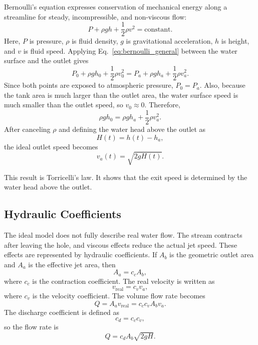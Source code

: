 \documentclass[11pt,letterpaper]{article}
\begin{document}
Bernoulli's equation expresses conservation of mechanical energy along a streamline for steady, incompressible, and non-viscous flow:
\begin{equation}
    P+\rho gh+\frac{1}{2}\rho v^2=\text{constant}.
    \label{eq:bernoulli_general}
\end{equation}
Here, $P$ is pressure, $\rho$ is fluid density, $g$ is gravitational acceleration, $h$ is height, and $v$ is fluid speed. Applying Eq.~\eqref{eq:bernoulli_general} between the water surface and the outlet gives
\begin{equation}
    P_0+\rho gh_0+\frac{1}{2}\rho v_0^2
    =
    P_a+\rho gh_a+\frac{1}{2}\rho v_a^2.
    \label{eq:bernoulli_points}
\end{equation}
Since both points are exposed to atmospheric pressure, $P_0=P_a$. Also, because the tank area is much larger than the outlet area, the water surface speed is much smaller than the outlet speed, so $v_0\approx0$. Therefore,
\begin{equation}
    \rho gh_0=\rho gh_a+\frac{1}{2}\rho v_a^2.
\end{equation}
After canceling $\rho$ and defining the water head above the outlet as
\begin{equation}
    H(t)=h(t)-h_a,
\end{equation}
the ideal outlet speed becomes
\begin{equation}
    v_a(t)=\sqrt{2gH(t)}.
    \label{eq:torricelli}
\end{equation}

This result is Torricelli's law. It shows that the exit speed is determined by the water head above the outlet.

\subsection{Hydraulic Coefficients}

The ideal model does not fully describe real water flow. The stream contracts after leaving the hole, and viscous effects reduce the actual jet speed. These effects are represented by hydraulic coefficients. If $A_b$ is the geometric outlet area and $A_a$ is the effective jet area, then
\begin{equation}
    A_a=c_cA_b,
\end{equation}
where $c_c$ is the contraction coefficient. The real velocity is written as
\begin{equation}
    v_{\text{real}}=c_vv_a,
\end{equation}
where $c_v$ is the velocity coefficient. The volume flow rate becomes
\begin{equation}
    Q=A_av_{\text{real}}=c_cc_vA_bv_a.
\end{equation}
The discharge coefficient is defined as
\begin{equation}
    c_d=c_cc_v,
\end{equation}
so the flow rate is
\begin{equation}
    Q=c_dA_b\sqrt{2gH}.
    \label{eq:flowrate}
\end{equation}
\end{document}
